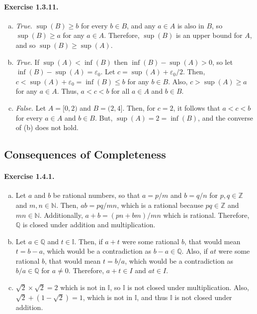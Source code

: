 \documentclass{article}
\newcommand{\N}{\mathbb{N}}
\newcommand{\Q}{\mathbb{Q}}
\newcommand{\Z}{\mathbb{Z}}
\newcommand{\I}{\mathbb{I}}
\begin{document}
\paragraph{Exercise 1.3.11.}
\begin{enumerate}[(a)]
    \item \textit{True.} $\sup(B) \geq b$ for every $b \in B$, and any $a \in A$ is also in $B$, so $\sup(B) \geq a$ for any $a \in A$. Therefore, $\sup(B)$ is an upper bound for $A$, and so $\sup(B) \geq \sup(A)$.
    \item \textit{True.} If $\sup(A) < \inf (B)$ then $\inf(B) - \sup(A) > 0$, so let $\inf(B) - \sup(A) = \varepsilon_0$. Let $c = \sup(A) + \varepsilon_0/2$. Then, $c < \sup(A)+\varepsilon_0 = \inf(B) \leq b$ for any $b \in B$. Also, $c > \sup(A) \geq a$ for any $a \in A$. Thus, $a < c< b$ for all $a \in A$ and $b \in B$.
    \item \textit{False.} Let $A = [0,2)$ and $B = (2, 4]$. Then, for $c =2$, it follows that $a<c<b$ for every $a\in A$ and $b \in B$. But, $\sup(A) = 2 = \inf(B)$, and the converse of (b) does not hold.
\end{enumerate}


\subsection{Consequences of Completeness}
\paragraph{Exercise 1.4.1.}
\begin{enumerate}[(a)]
    \item Let $a$ and $b$ be rational numbers, so that $a=p/m$ and $b=q/n$ for $p,q\in \Z$ and $m,n\in \N$. Then, $ab=pq/mn$, which is a rational because $pq\in \Z$ and $mn \in \N$. Additionally, $a+b=(pn+bm)/mn$ which is rational. Therefore, $\Q$ is closed under addition and multiplication.
    \item Let $a\in \Q$ and $t\in \I$. Then, if $a+t$ were some rational $b$, that would mean $t=b-a$, which would be a contradiction as $b-a \in \Q$. Also, if $at$ were some rational $b$, that would mean $t=b/a$, which would be a contradiction as $b/a \in \Q$ for $a \neq 0$. Therefore, $a+t\in I$ and $at \in I$.
    \item $\sqrt{2}\times \sqrt{2} = 2$ which is not in $\I$, so $\I$ is not closed under multiplication. Also, $\sqrt{2} + (1 - \sqrt{2}) = 1$, which is not in $\I$, and thus $\I$ is not closed under addition.
\end{enumerate}
\end{document}
